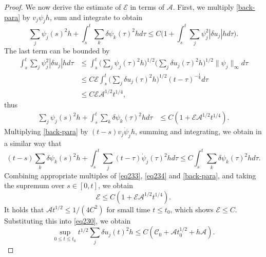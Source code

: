 \documentclass[a4paper,oneside,11pt]{article}
\numberwithin{equation}{section}
\begin{document}
\begin{proof}
We now derive  the estimate of $\mathscr{E}$ in terms of $\mathscr{A}$.
First, we multiply \eqref{back-para} by \(v_j\psi_jh\), sum and integrate to obtain
$$\sum_{j}\psi_{j}(s)^{2}h+\int_{s}^{t}\sum\limits_{k}\delta\psi_{k}(\tau)^{2}hd\tau\leq C\Big(1+\int_{s}^{t}\sum_{j}\psi_{j}^{2}|\delta u_{j}|hd\tau\Big).$$
The last term can be bounded by
\begin{equation*}
\begin{aligned}
\int_{s}^{t}\sum_{j}\psi_{j}^{2}|\delta u_{j}|hd\tau
&\leq\int_{s}^{t}\Big(\sum_{j}\psi_{j}(\tau)^{2}h\Big)^{1/2}\Big(\sum_{j}\delta u_{j}(\tau)^{2}h\Big)^{1/2}\|\psi_j\|_\infty d\tau\\
&\leq C{\mathscr{E}}\int_{s}^{t}\Big(\sum_{j}\delta u_{j}(\tau)^{2}h\Big)^{1/2}(t-\tau)^{-\frac14} d\tau\\
&\leq C{\mathscr{E}}{\mathscr{A}}^{1/2}t^{1/4},
\end{aligned}
\end{equation*}
thus
\begin{equation}\label{eq233}
\begin{aligned}
\sum_{j}\psi_{j}(s)^{2}h+\int_{s}^{t}\sum\limits_{k}\delta\psi_{k}(\tau)^{2}hd\tau
&\leq C(1+{\mathscr{E}}{\mathscr{A}}^{1/2}t^{1/4}).
\end{aligned}
\end{equation}
Multiplying \eqref{back-para} by \(\left(t-s\right)v_{j}\dot{\psi}_{j}h\), summing
and integrating, we obtain in a similar way that
\begin{equation}\label{eq234}
(t-s)\sum\limits_{k}\delta\psi_{k}(s)^{2}h+\int_{s}^{t}\sum\limits_{j}(t-\tau)\dot{\psi}_{j}(\tau)^{2}hd\tau\leq C\int_{s}^{t}\sum\limits_{k}\delta\psi_{k}(\tau)^{2}hd\tau.\end{equation}
Combining appropriate multiples of \eqref{eq233}, \eqref{eq234} and \eqref{back-para}, and taking the
supremum over \(s\in[0,t]\), we obtain
\begin{equation}\label{eq231}
\mathscr{E}\leq C(1+\mathscr{E}\mathscr{A}^{1/2}t^{1/4}).  
\end{equation}
It holds that \(\mathscr{A}t^{1/2}\leq1/(4C^{2})\) for small time $t\leq t_0$, which shows \(\mathscr{E}\leq C\). Substituting this into \eqref{eq230}, we obtain 
\begin{equation}\label{eq:est-ux}
\sup_{0\leq t\leq t_{0}}t^{1/2}\sum_{j}\delta u_{j}(t)^{2}h\leq C(\mathscr{C}_{0}+\mathscr{A}t_0^{1/2}+ h\mathscr{A}).\end{equation}


\end{proof}
\end{document}
